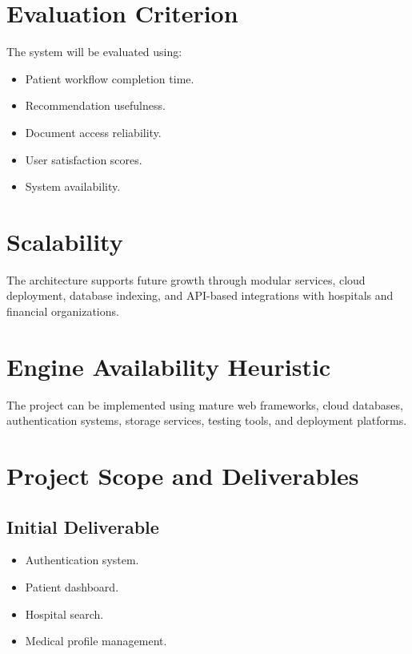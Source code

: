 \documentclass[12pt,a4paper]{article}
\begin{document}
\section{Evaluation Criterion}

The system will be evaluated using:

\begin{itemize}
    \item Patient workflow completion time.
    \item Recommendation usefulness.
    \item Document access reliability.
    \item User satisfaction scores.
    \item System availability.
\end{itemize}

\section{Scalability}

The architecture supports future growth through modular services, cloud
deployment, database indexing, and API-based integrations with hospitals
and financial organizations.

\section{Engine Availability Heuristic}

The project can be implemented using mature web frameworks, cloud
databases, authentication systems, storage services, testing tools, and
deployment platforms.

\section{Project Scope and Deliverables}

\subsection{Initial Deliverable}

\begin{itemize}
    \item Authentication system.
    \item Patient dashboard.
    \item Hospital search.
    \item Medical profile management.
\end{itemize}
\end{document}
